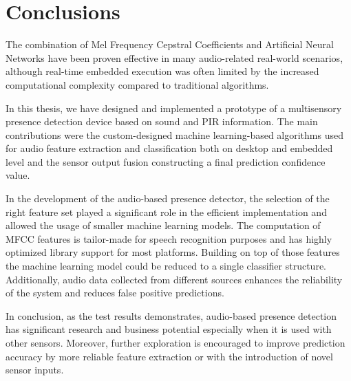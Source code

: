 \chapter{Conclusions}
\label{chapter:conclusions}





The combination of Mel Frequency Cepstral Coefficients and Artificial Neural Networks have been proven effective in many audio-related real-world scenarios, although real-time embedded execution was often limited by the increased computational complexity compared to traditional algorithms. 

In this thesis, we have designed and implemented a prototype of a multisensory presence detection device based on sound and PIR information. The main contributions were the custom-designed machine learning-based algorithms used for audio feature extraction and classification both on desktop and embedded level and the sensor output fusion constructing a final prediction confidence value.

In the development of the audio-based presence detector, the selection of the right feature set played a significant role in the efficient implementation and allowed the usage of smaller machine learning models. The computation of MFCC features is tailor-made for speech recognition purposes and has highly optimized library support for most platforms. Building on top of those features the machine learning model could be reduced to a single classifier structure. Additionally, audio data collected from different sources enhances the reliability of the system and reduces false positive predictions.

In conclusion, as the test results demonstrates, audio-based presence detection has significant research and business potential especially when it is used with other sensors. Moreover, further exploration is encouraged to improve prediction accuracy by more reliable feature extraction or with the introduction of novel sensor inputs.

